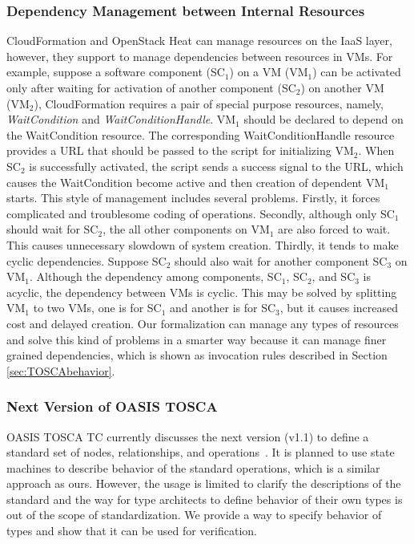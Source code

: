\documentclass[12pt]{report}
\begin{document}
\subsubsection{Dependency Management between Internal Resources}
CloudFormation and OpenStack Heat can manage resources on the IaaS
layer, however, they support to manage dependencies between resources
in VMs. For example, suppose a software component (SC$_1$) on a
VM (VM$_1$) can be activated only after waiting for activation of
another component (SC$_2$) on another VM (VM$_2$), CloudFormation
requires a pair of special purpose resources, namely, {\it
  WaitCondition} and {\it WaitConditionHandle}. VM$_1$ should be
declared to depend on the WaitCondition resource. The corresponding
WaitConditionHandle resource provides a URL that should be passed to
the script for initializing VM$_2$. When SC$_2$ is successfully
activated, the script sends a success signal to the URL, which causes
the WaitCondition become active and then creation of dependent VM$_1$
starts. This style of management includes several problems. Firstly,
it forces complicated and troublesome coding of operations.  Secondly,
although only SC$_1$ should wait for SC$_2$, the all other components on
VM$_1$ are also forced to wait. This causes unnecessary slowdown of
system creation. Thirdly, it tends to make cyclic
dependencies. Suppose SC$_2$ should also wait for another component
SC$_3$ on VM$_1$. Although the dependency among components, SC$_1$,
SC$_2$, and SC$_3$ is acyclic, the dependency between VMs is
cyclic. This may be solved by splitting VM$_1$ to two VMs, one is for
SC$_1$ and another is for SC$_3$, but it causes increased cost and
delayed creation. Our formalization can manage any types of resources
and solve this kind of problems in a smarter way because it can manage
finer grained dependencies, which is shown as invocation rules
described in Section \ref{sec:TOSCAbehavior}.

\subsubsection{Next Version of OASIS TOSCA}
OASIS TOSCA TC currently discusses the next version (v1.1) to define a
standard set of nodes, relationships, and
operations~\cite{TOSCAYAML}. It is planned to use state machines to
describe behavior of the standard operations, which is a similar
approach as ours. However, the usage is limited to clarify the
descriptions of the standard and the way for type architects to define
behavior of their own types is out of the scope of standardization. We
provide a way to specify behavior of types and show that it can be
used for verification.
\end{document}
